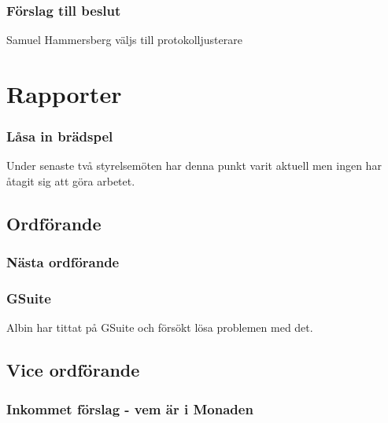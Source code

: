\documentclass[protokoll]{dvd}
\begin{document}
\subsubsection*{Förslag till beslut}

\begin{attsatser}
\item Samuel Hammersberg väljs till protokolljusterare
\end{attsatser}






\section{Rapporter}

\subsubsection{Låsa in brädspel}

Under senaste två styrelsemöten har denna punkt varit aktuell men ingen har åtagit sig att göra arbetet. 









\newpage

\subsection{Ordförande}


\subsubsection{Nästa ordförande}


\subsubsection{GSuite}

Albin har tittat på GSuite och försökt lösa problemen med det.



\newpage

\subsection{Vice ordförande}


\subsubsection{Inkommet förslag - vem är i Monaden}
\end{document}
